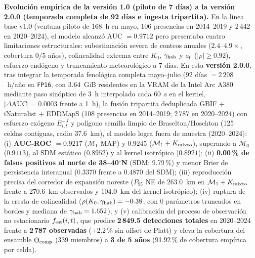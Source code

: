\documentclass[11pt,letterpaper]{article}
\begin{document}
\textbf{Evolución empírica de la versión 1.0 (piloto de 7 días) a la versión 2.0.0 (temporada completa de 92 días e ingesta tripartita).} En la línea base v1.0 (ventana piloto de 168~h en mayo, 106 presencias en 2014--2019 y 2\,442 en 2020--2024), el modelo alcanzó AUC $=0.9712$ pero presentaba cuatro limitaciones estructurales: subestimación severa de conteos anuales ($2.4$--$4.9\times$, cobertura $0/5$ años), colinealidad extrema entre $K_0$, $\gamma_{\rm hab}$ y $a_0$ ($|\rho|\ge0.92$), esfuerzo endógeno y truncamiento meteorológico a 7 días. En esta \textbf{versión 2.0.0}, tras integrar la temporada fenológica completa mayo--julio (92 días $=2\,208$~h/año en \texttt{FP16}, con 3.64~GiB residentes en la VRAM de la Intel Arc A380 mediante paso sinóptico de 3~h interpolado cada 60~s en el kernel, $|\Delta\text{AUC}|=0.0003$ frente a 1~h), la fusión tripartita deduplicada GBIF + iNaturalist + EDDMapS (108 presencias en 2014--2019; 2\,787 en 2020--2024) con esfuerzo exógeno $E^{-J}_{i,t}$ y polígono semilla limpio de Braselton/Hoschton (125 celdas contiguas, radio 37.6~km), el modelo logra fuera de muestra (2020--2024): (i) \textbf{AUC-ROC $=0.9217$} ($\mathcal M_1$ MAP) y \textbf{$0.9245$} ($\mathcal M_1+K_{\rm mixto}$), superando a $\mathcal M_0$ ($0.9113$), al SDM estático ($0.8952$) y al kernel isotrópico ($0.8921$); (ii) \textbf{0.00\,\% de falsos positivos al norte de 38--40$^\circ$N} (SDM: 9.79\,\%) y menor Brier de persistencia interanual ($0.3370$ frente a $0.4870$ del SDM); (iii) reproducción precisa del corredor de expansión noreste ($P_{95}$ NE de $263.0$~km en $\mathcal M_1+K_{\rm mixto}$ frente a $270.6$~km observados y $104.0$~km del kernel isotrópico); (iv) ruptura de la cresta de colinealidad ($\rho(K_0,\gamma_{\rm hab})=-0.38$, con 0 parámetros truncados en bordes y mediana de $\gamma_{\rm hab}=1.652$); y (v) calibración del proceso de observación no estacionario $f_{\rm est}(i,t)$, que predice \textbf{2\,849.5 detecciones totales} en 2020--2024 frente a \textbf{2\,787 observadas} ($+2.2$\,\% sin offset de Platt) y eleva la cobertura del ensamble $\Theta_{\rm comp}$ (339 miembros) a \textbf{3 de 5 años} (91.92\,\% de cobertura empírica por celda).

\end{document}

